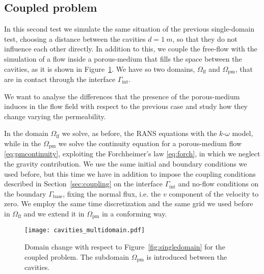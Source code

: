 \subsection{Coupled problem}
In this second test we simulate the same situation of the previous single-domain test, 
choosing a distance between the cavities $d=\SI{1}{m}$, so that they do not influence each other directly. In addition to this, we couple the 
free-flow with the simulation of a flow inside a porous-medium that fills the space between 
the cavities, as it is shown in Figure~\ref{fig:multidomain}. We have so two 
domains, $\Omega_\text{ff}$ and $\Omega_\text{pm}$, that are in contact through the 
interface $\Gamma_\text{int}$.

We want to analyse the differences that the presence of the porous-medium 
induces in the flow field with respect to the previous case and study how they change
varying the permeability.

In the domain $\Omega_\text{ff}$ we solve, as before, the RANS equations with the 
$k\text{-}\omega$ model, while in the $\Omega_\text{pm}$ we solve the continuity equation
for a porous-medium flow \eqref{eq:pmcontinuity}, exploiting the Forchheimer's law \eqref{eq:forch}, in which we neglect the gravity contribution.
We use the same initial and boundary conditions we used before, but this time we 
have in addition to impose the coupling conditions described in Section~\ref{sec:coupling} on the interface 
$\Gamma_\text{int}$ and no-flow conditions on the boundary $\Gamma_\text{base}$, fixing the normal flux, i.e. the $v$ component of the velocity to zero.
We employ the same time discretization and the same grid we used before in $\Omega_\text{ff}$ and we extend it in 
$\Omega_\text{pm}$ in a conforming way.
\begin{figure}
	\centering
	\texttt{[image: cavities\_multidomain.pdf]}
	\caption[Domain change with respect to Figure~\ref{fig:singledomain} for the coupled problem]{Domain change with respect to Figure~\ref{fig:singledomain} for the coupled problem. The subdomain $\Omega_\text{pm}$ is introduced between the cavities.}
	\label{fig:multidomain}
\end{figure}

